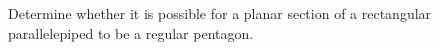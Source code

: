 Determine whether it is possible for a planar section of a
rectangular parallelepiped to be a regular pentagon.
